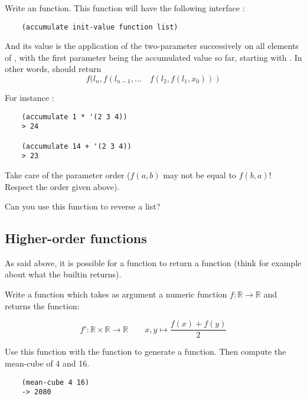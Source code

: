 \documentclass{../../../tp}
\begin{document}
\begin{instruction}
	Write an  function. This function will have the following interface :
	\begin{verbatim}
	(accumulate init-value function list)
	\end{verbatim}	
	
	And its value is the application of the two-parameter  successively on all elements of , with the first parameter being the accumulated value so far, starting with . In other words,  should return
	$$ f(l_n, f(l_{n-1}, ... \quad f(l_2, f(l_1, x_0))) $$
	
	For instance :
	\begin{verbatim}
	(accumulate 1 * '(2 3 4))
	> 24
	
	(accumulate 14 + '(2 3 4))
	> 23
	\end{verbatim}	
	
	Take care of the parameter order ($f(a,b)$ may not be equal to $f(b,a)$! Respect the order given above).
	
	Can you use this function to reverse a list? 
\end{instruction}

	
\subsection{Higher-order functions}

As said above, it is possible for a function to return a function (think for example about what the  builtin returns). 

\begin{instruction}
	Write a function  which takes as argument a numeric function $f: \mathbb{R} \rightarrow \mathbb{R}$ and returns the function: 
	
	$$ f': \mathbb{R} \times \mathbb{R} \rightarrow \mathbb{R} \qquad  x,y  \mapsto  \frac{f(x) + f(y)}{2}$$
	
	
	Use this function with the  function to generate a  function. Then compute the mean-cube of 4 and 16.
	
	\begin{verbatim}
	(mean-cube 4 16)
	-> 2080
	\end{verbatim}
	
\end{instruction}
\end{document}
